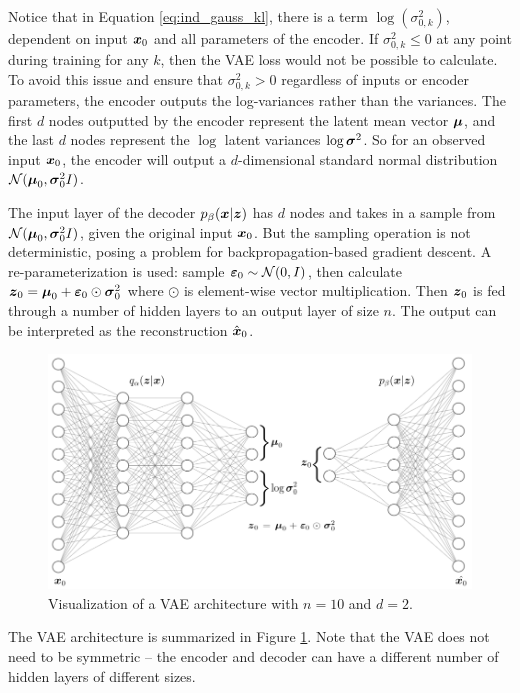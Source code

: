 Notice that in Equation \ref{eq:ind_gauss_kl}, there is a term $\log(\sigma_{0,k}^2)$, dependent on input $\boldsymbol{x}_0$ and all parameters of the encoder. If $\sigma_{0,k}^2 \leq 0$ at any point during training for any $k$, then the VAE loss would not be possible to calculate. To avoid this issue and ensure that $\sigma_{0,k}^2 > 0$ regardless of inputs or encoder parameters, the encoder outputs the log-variances rather than the variances. The first $d$ nodes outputted by the encoder represent the latent mean vector $\boldsymbol{\mu}$, and the last $d$ nodes represent the $\log$ latent variances $\log \boldsymbol{\sigma}^2$. So for an observed input $\boldsymbol{x}_0$, the encoder will output a $d$-dimensional standard normal distribution $\mathcal{N}(\boldsymbol{\mu}_0, \boldsymbol{\sigma}_0^2I)$.

The input layer of the decoder $p_\beta(\boldsymbol{x} | \boldsymbol{z})$ has $d$ nodes and takes in a sample from $\mathcal{N}(\boldsymbol{\mu}_0, \boldsymbol{\sigma}_0^2I)$, given the original input $\boldsymbol{x}_0$. But the sampling operation is not deterministic, posing a problem for backpropagation-based gradient descent. A re-parameterization is used: sample $\boldsymbol{\varepsilon}_0 \sim \mathcal{N}(0,I)$, then calculate $\boldsymbol{z}_0 = \boldsymbol{\mu}_0 + \boldsymbol{\varepsilon}_0 \odot \boldsymbol{\sigma}_0^2$ where $\odot$ is element-wise vector multiplication. Then $\boldsymbol{z}_0$ is fed through a number of hidden layers to an output layer of size $n$. The output can be interpreted as the reconstruction $\hat{\boldsymbol{x}}_0$.

\begin{figure}[h]
  \centering
  \includegraphics[width=.95\textwidth]{img/vae_visual.png}
  \caption{Visualization of a VAE architecture with $n=10$ and $d=2$.}
  \label{fig:vae_visual}
\end{figure}
The VAE architecture is summarized in Figure \ref{fig:vae_visual}. Note that the VAE does not need to be symmetric -- the encoder and decoder can have a different number of hidden layers of different sizes.


